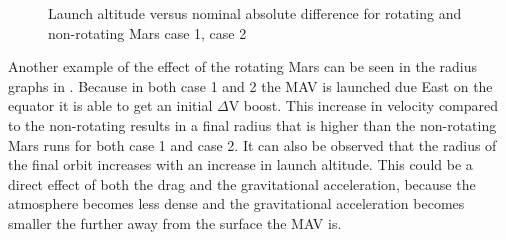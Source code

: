 \begin{figure}[H]
\centering
{} 
\caption{Launch altitude versus nominal absolute difference for rotating and non-rotating Mars \protect{} case 1,  \protect{} case 2 } 
\label{fig:launchAltitudeVsNominalAbsoluteDifferenceCase1combinedSmall} 
\end{figure} 

\noindent
Another example of the effect of the rotating Mars can be seen in the radius graphs in . Because in both case 1 and 2 the \ac{MAV} is launched due East on the equator it is able to get an initial $\Delta$V boost. This increase in velocity compared to the non-rotating results in a final radius that is higher than the non-rotating Mars runs for both case 1 and case 2. It can also be observed that the radius of the final orbit increases with an increase in launch altitude. This could be a direct effect of both the drag and the gravitational acceleration, because the atmosphere becomes less dense and the gravitational acceleration becomes smaller the further away from the surface the \ac{MAV} is.



